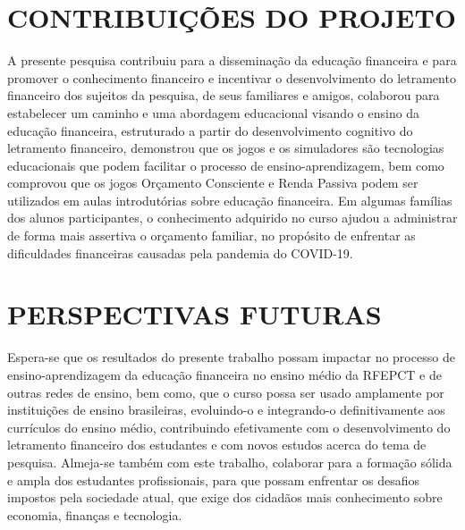 \section{CONTRIBUIÇÕES DO PROJETO}
A presente pesquisa contribuiu para a disseminação da educação financeira e para promover o conhecimento financeiro e incentivar o desenvolvimento do letramento financeiro dos sujeitos da pesquisa, de seus familiares e amigos, colaborou para estabelecer um caminho e uma abordagem educacional visando o ensino da educação financeira, estruturado a partir do desenvolvimento cognitivo do letramento financeiro, demonstrou que os jogos e os simuladores são tecnologias educacionais que podem facilitar o processo de ensino-aprendizagem, bem como comprovou que os jogos Orçamento Consciente e Renda Passiva podem ser utilizados em aulas introdutórias sobre educação financeira. Em algumas famílias dos alunos participantes, o conhecimento adquirido no curso ajudou a administrar de forma mais assertiva o orçamento familiar, no propósito de enfrentar as dificuldades financeiras causadas pela pandemia do COVID-19.

\section{PERSPECTIVAS FUTURAS}
Espera-se que os resultados do presente trabalho possam impactar no processo de ensino-aprendizagem da educação financeira no ensino médio da RFEPCT e de outras redes de ensino, bem como, que o curso possa ser usado amplamente por instituições de ensino brasileiras, evoluindo-o e integrando-o definitivamente aos currículos do ensino médio, contribuindo efetivamente com o desenvolvimento do letramento financeiro dos estudantes e com novos estudos acerca do tema de pesquisa. Almeja-se também com este trabalho, colaborar para a formação sólida e ampla dos estudantes profissionais, para que possam enfrentar os desafios impostos pela sociedade atual, que exige dos cidadãos mais conhecimento sobre economia, finanças e tecnologia.


